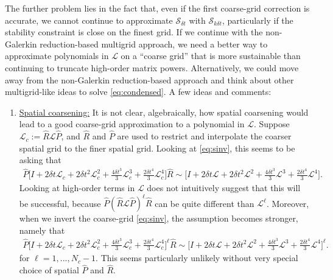 \documentclass[a4paper,12pt]{article}
\begin{document}
The further problem lies in the fact that, even if the first coarse-grid correction is accurate, we cannot continue to approximate
$\mathcal{S}_{\delta t}$ with $\mathcal{S}_{k\delta t}$, particularly if the stability constraint is close on the finest grid. If we continue
with the non-Galerkin reduction-based multigrid approach, we need a better way to approximate polynomials in $\mathcal{L}$ on
a ``coarse grid'' that is more sustainable than continuing to truncate high-order matrix powers. Alternatively, we could move away
from the non-Galerkin reduction-based approach and think about other multigrid-like ideas to solve \eqref{eq:condensed}. A few
ideas and comments:
%
\begin{enumerate}
\item \underline{Spatial coarsening:} It is not clear, algebraically, how spatial coarsening would lead to a good coarse-grid
approximation to a polynomial in $\mathcal{L}$. Suppose $\mathcal{L}_c := \hat{R}\mathcal{L}\hat{P}$, and $\hat{R}$ and $\hat{P}$
are used to restrict and interpolate the coarser spatial grid to the finer spatial grid. Looking at \eqref{eq:sinv}, this seems to be
asking that
\begin{align*}
\hat{P}\Big[I + 2 \delta t \mathcal{L}_c + 2 \delta t^2\mathcal{L}_c^2 +  \tfrac{4\delta t^3}{3}\mathcal{L}_c^3 +
 	\tfrac{2\delta t^4}{3}\mathcal{L}_c^4 \Big]\hat{R} \sim  \Big[I + 2 \delta t \mathcal{L} + 2 \delta t^2\mathcal{L}^2 + 
	\tfrac{4\delta t^3}{3}\mathcal{L}^3 + \tfrac{2\delta t^4}{3}\mathcal{L}^4\Big] .
\end{align*}
Looking at high-order terms in $\mathcal{L}$ does not intuitively suggest that this will be successful, because
$\hat{P}(\hat{R}\mathcal{L}\hat{P})^\ell\hat{R}$ can be quite different than $\mathcal{L}^\ell$. Moreover, when
we invert the coarse-grid \eqref{eq:sinv}, the assumption becomes stronger, namely that
\begin{align*}
\hat{P}\Big[I + 2 \delta t \mathcal{L}_c + 2 \delta t^2\mathcal{L}_c^2 +  \tfrac{4\delta t^3}{3}\mathcal{L}_c^3 +
 	\tfrac{2\delta t^4}{3}\mathcal{L}_c^4 \Big]^\ell\hat{R} \sim  \Big[I + 2 \delta t \mathcal{L} + 2 \delta t^2\mathcal{L}^2 + 
	\tfrac{4\delta t^3}{3}\mathcal{L}^3 + \tfrac{2\delta t^4}{3}\mathcal{L}^4\Big]^\ell .
\end{align*}
for $\ell = 1,...,N_c-1$. This seems particularly unlikely without very special choice of spatial $\hat{P}$ and $\hat{R}$. 


\end{enumerate}
\end{document}
